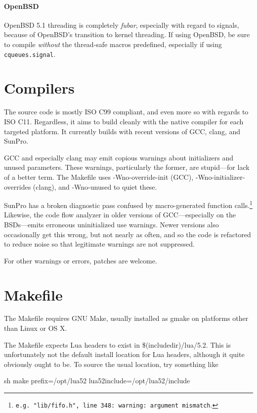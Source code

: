 \documentclass[11pt, oneside]{memoir}
\newcommand*{\module}[1]{\texttt{#1}\xspace}
\begin{document}
\paragraph{OpenBSD}
OpenBSD 5.1 threading is completely \emph{fubar}, especially with regard to signals, because of OpenBSD's transition to kernel threading. If using OpenBSD, be sure to compile \emph{without} the thread-safe macros predefined, especially if using \module{cqueues.signal}.

\section{Compilers}

The source code is mostly ISO C99 compliant, and even more so with regards to ISO C11. Regardless, it aims to build cleanly with the native compiler for each targeted platform. It currently builds with recent versions of GCC, clang, and SunPro.

GCC and especially clang may emit copious warnings about initializers and unused parameters. These warnings, particularly the former, are stupid---for lack of a better term. The Makefile uses -Wno-override-init (GCC), -Wno-initializer-overrides (clang), and -Wno-unused to quiet these.

SunPro has a broken diagnostic pass confused by macro-generated function calls.\footnote{\texttt{e.g.\ "lib/fifo.h", line 348:\ warning:\ argument mismatch}.} Likewise, the code flow analyzer in older versions of GCC---especially on the BSDs---emits erroneous uninitialized use warnings. Newer versions also occasionally get this wrong, but not nearly as often, and so the code is refactored to reduce noise so that legitimate warnings are not suppressed.

For other warnings or errors, patches are welcome.

\section{Makefile}

The Makefile requires GNU Make, usually installed as gmake on platforms other than Linux or OS X.

The Makefile expects Lua headers to exist in \$(includedir)/lua/5.2. This is unfortunately not the default install location for Lua headers, although it quite obviously ought to be. To source the usual location, try something like

\begin{code}{sh}
make prefix=/opt/lua52 lua52include=/opt/lua52/include
\end{code}
\end{document}
